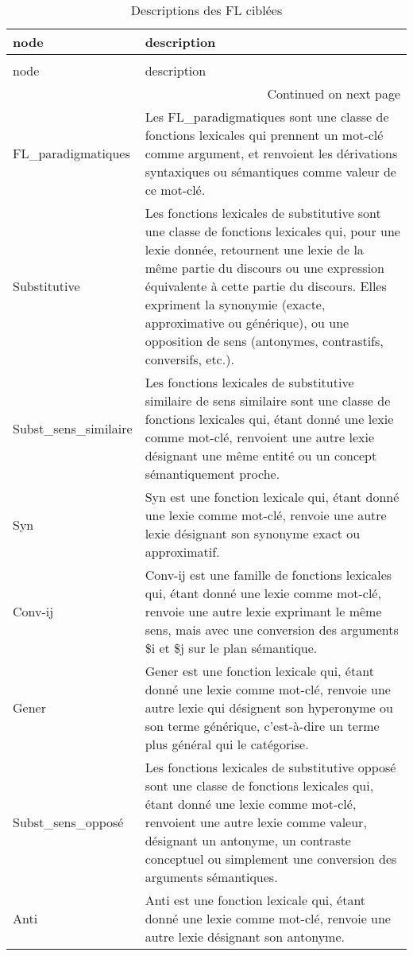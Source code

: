 \begin{longtable}{ll}
\caption{Descriptions des FL ciblées} \label{tab:descriptions-fl} \\
\toprule
node & description \\
\midrule
\endfirsthead
\caption[]{Descriptions des FL ciblées} \\
\toprule
node & description \\
\midrule
\endhead
\midrule
\multicolumn{2}{r}{Continued on next page} \\
\midrule
\endfoot
\bottomrule
\endlastfoot
FL\_paradigmatiques & Les FL\_paradigmatiques sont une classe de fonctions lexicales qui prennent un mot-clé comme argument, et renvoient les dérivations syntaxiques ou sémantiques comme valeur de ce mot-clé. \\
Substitutive & Les fonctions lexicales de substitutive sont une classe de fonctions lexicales qui, pour une lexie donnée, retournent une lexie de la même partie du discours ou une expression équivalente à cette partie du discours. Elles expriment la synonymie (exacte, approximative ou générique), ou une opposition de sens (antonymes, contrastifs, conversifs, etc.). \\
Subst\_sens\_similaire & Les fonctions lexicales de substitutive similaire de sens similaire sont une classe de fonctions lexicales qui, étant donné une lexie comme mot-clé, renvoient une autre lexie désignant une même entité ou un concept sémantiquement proche. \\
Syn & Syn est une fonction lexicale qui, étant donné une lexie comme mot-clé, renvoie une autre lexie désignant son synonyme exact ou approximatif. \\
Conv-ij & Conv-ij est une famille de fonctions lexicales qui, étant donné une lexie comme mot-clé, renvoie une autre lexie exprimant le même sens, mais avec une conversion des arguments \$i et \$j sur le plan sémantique. \\
Gener & Gener est une fonction lexicale qui, étant donné une lexie comme mot-clé, renvoie une autre lexie qui désignent son hyperonyme ou son terme générique, c'est-à-dire un terme plus général qui le catégorise. \\
Subst\_sens\_opposé & Les fonctions lexicales de substitutive opposé sont une classe de fonctions lexicales qui, étant donné une lexie comme mot-clé, renvoient une autre lexie comme valeur, désignant un antonyme, un contraste conceptuel ou simplement une conversion des arguments sémantiques. \\
Anti & Anti est une fonction lexicale qui, étant donné une lexie comme mot-clé, renvoie une autre lexie désignant son antonyme. \\

\end{longtable}
